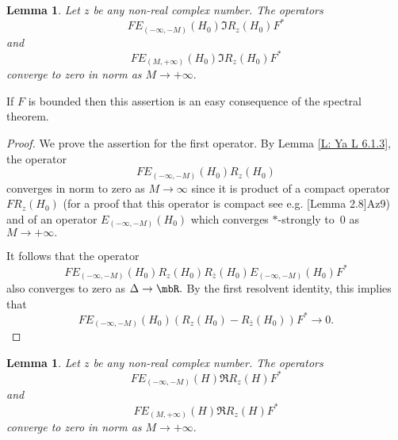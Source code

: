 \documentclass[11pt]{amsart}
\newtheorem{lemma}[thm]{Lemma}
\numberwithin{equation}{section}
\begin{document}
\begin{lemma} \label{L: Im part of Tz}
Let $z$ be any non-real complex number.
The operators
$$
  FE_{(-\infty,-M)}(H_0) \Im R_z(H_0) F^*
$$
and
$$
  FE_{(M,+\infty)}(H_0) \Im R_z(H_0) F^*
$$
converge to zero in norm as $M \to +\infty.$
\end{lemma}
If $F$ is bounded then this assertion is an easy consequence of the spectral theorem.
\begin{proof} We prove the assertion for the first operator.
By Lemma \ref{L: Ya L 6.1.3}, the operator
$$
  F E_{(-\infty,-M)}(H_0)R_z(H_0)
$$
converges in norm to zero as $M \to \infty$ since it is product of a compact operator
$F R_z(H_0)$ (for a proof that this operator is compact see e.g. {\futurelet\NChar\CleverCite}[Lemma 2.8]{Az9})
and of an operator $E_{(-\infty,-M)}(H_0)$ which converges $*$-strongly to~$0$ as $M \to +\infty.$

It follows that the operator
$$
  F E_{(-\infty,-M)}(H_0)R_{z}(H_0) R_{\bar z}(H_0) E_{(-\infty,-M)}(H_0) F^*
$$
also converges to zero as $\Delta \to \mbR.$
By the first resolvent identity, this implies that
$$
  F E_{(-\infty,-M)}(H_0)(R_{z}(H_0) - R_{\bar z}(H_0)) F^* \to 0.
$$
\end{proof}
\begin{lemma} \label{L: Re part of Tz}
Let $z$ be any non-real complex number.
The operators
$$
  FE_{(-\infty,-M)}(H) \Re R_z(H) F^*
$$
and
$$
  FE_{(M,+\infty)}(H) \Re R_z(H) F^*
$$
converge to zero in norm as $M \to +\infty.$
\end{lemma}
\end{document}
